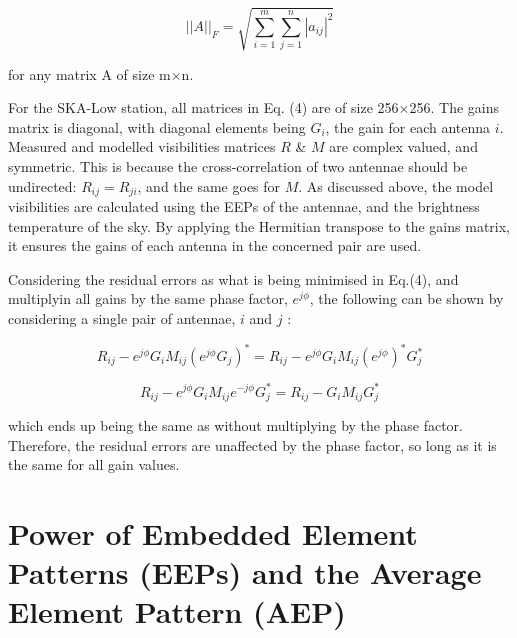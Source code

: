 \documentclass[12pt]{report} %
\begin{document}
\begin{equation}
    ||A||_{F} = \sqrt{\sum_{i=1}^{m} \sum_{j=1}^{n} |a_{ij}|^{2}}
\end{equation}

for any matrix A of size m$\times$n.


For the SKA-Low station, all matrices in Eq. (4) are of size 256$\times$256. The gains matrix is diagonal, with diagonal elements being $G_{i}$, the gain for each antenna $i$. Measured and modelled visibilities matrices $R$ \& $M$ are complex valued, and symmetric. This is because the cross-correlation of two antennae should be undirected: $R_{ij} = R_{ji}$, and the same goes for $M$. As discussed above, the model visibilities are calculated using the EEPs of the antennae, and the brightness temperature of the sky. By applying the Hermitian transpose to the gains matrix, it ensures the gains of each antenna in the concerned pair are used.

Considering the residual errors as what is being minimised in Eq.(4), and multiplyin all gains by the same phase factor, $e^{j\phi}$, the following can be shown by considering a single pair of antennae, $i$ and $j$ \cite{complex_conjugates}:

\begin{equation}
  R_{ij} - e^{j\phi}G_{i}M_{ij}(e^{j\phi}G_{j})^{*} = R_{ij} -  e^{j\phi}G_{i}M_{ij}(e^{j\phi})^{*}G_{j}^{*}
\end{equation}

\begin{equation}
  R_{ij} -  e^{j\phi}G_{i}M_{ij}e^{-j\phi}G_{j}^{*} = R_{ij} -  G_{i}M_{ij}G_{j}^{*}
\end{equation}

which ends up being the same as without multiplying by the phase factor. Therefore, the residual errors are unaffected by the phase factor, so long as it is the same for all gain values.

\section{Power of Embedded Element Patterns (EEPs) and the Average Element Pattern (AEP)}
\end{document}
